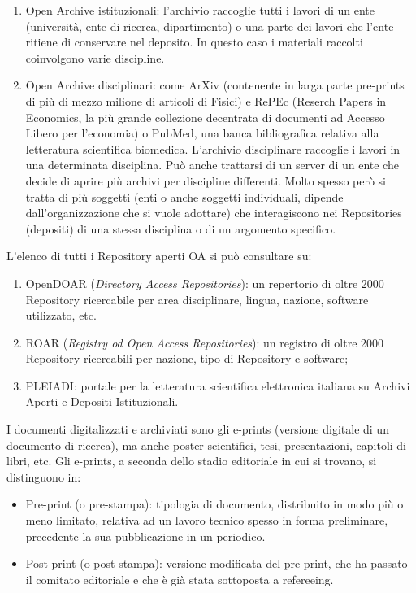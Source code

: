 \begin{enumerate}
\def\labelenumi{\arabic{enumi}.}
\item
  Open Archive istituzionali: l'archivio raccoglie tutti i lavori di un
  ente (università, ente di ricerca, dipartimento) o una parte dei
  lavori che l'ente ritiene di conservare nel deposito. In questo caso i
  materiali raccolti coinvolgono varie discipline.
\item
  Open Archive disciplinari: come ArXiv (contenente in larga parte
  pre-prints di più di mezzo milione di articoli di Fisici) e RePEc
  (Reserch Papers in Economics, la più grande collezione decentrata di
  documenti ad Accesso Libero per l'economia) o PubMed, una banca
  bibliografica relativa alla letteratura scientifica biomedica.
  L'archivio disciplinare raccoglie i lavori in una determinata
  disciplina. Può anche trattarsi di un server di un ente che decide di
  aprire più archivi per discipline differenti. Molto spesso però si
  tratta di più soggetti (enti o anche soggetti individuali, dipende
  dall'organizzazione che si vuole adottare) che interagiscono nei
  Repositories (depositi) di una stessa disciplina o di un argomento
  specifico.
\end{enumerate}

L'elenco di tutti i Repository aperti OA si può consultare su:

\begin{enumerate}
\def\labelenumi{\arabic{enumi}.}
\item
  OpenDOAR (\emph{Directory Access Repositories}): un repertorio di
  oltre 2000 Repository ricercabile per area disciplinare, lingua,
  nazione, software utilizzato, etc.
\item
  ROAR (\emph{Registry od Open Access Repositories}): un registro di
  oltre 2000 Repository ricercabili per nazione, tipo di Repository e
  software;
\item
  PLEIADI: portale per la letteratura scientifica elettronica italiana
  su Archivi Aperti e Depositi Istituzionali.
\end{enumerate}

I documenti digitalizzati e archiviati sono gli e-prints (versione
digitale di un documento di ricerca), ma anche poster scientifici, tesi,
presentazioni, capitoli di libri, etc. Gli e-prints, a seconda dello
stadio editoriale in cui si trovano, si distinguono in:

\begin{itemize}
\item
  Pre-print (o pre-stampa): tipologia di documento, distribuito in modo
  più o meno limitato, relativa ad un lavoro tecnico spesso in forma
  preliminare, precedente la sua pubblicazione in un periodico.
\item
  Post-print (o post-stampa): versione modificata del pre-print, che ha
  passato il comitato editoriale e che è già stata sottoposta a
  refereeing.
\end{itemize}

